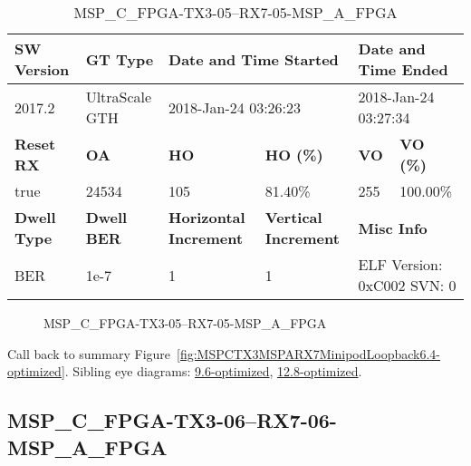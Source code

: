 \begin{table}[h]
\centering
\caption{MSP\_C\_FPGA-TX3-05--RX7-05-MSP\_A\_FPGA}
\label{tab:MSPCFPGATX305RX705MSPAFPGA6.4-optimized}
\begin{tabular}{@{}|l|l|l|l|l|l|@{}}
\toprule
\textbf{SW Version}                & \textbf{GT Type}   & \multicolumn{2}{l|}{\textbf{Date and Time Started}}            & \multicolumn{2}{l|}{\textbf{Date and Time Ended}}        \\ \midrule
2017.2                       & UltraScale GTH          & \multicolumn{2}{l|}{2018-Jan-24 03:26:23}                   & \multicolumn{2}{l|}{2018-Jan-24 03:27:34}               \\ \midrule
\textbf{Reset RX}                  & \textbf{OA} & \textbf{HO}   & \textbf{HO (\%)} & \textbf{VO} & \textbf{VO (\%)} \\ \midrule
true & 24534        & 105          & 81.40\%        & 255        & 100.00\%       \\ \midrule
\textbf{Dwell Type}                & \textbf{Dwell BER} & \textbf{Horizontal Increment} & \textbf{Vertical Increment}    & \multicolumn{2}{l|}{\textbf{Misc Info}}                  \\ \midrule
BER                            & 1e-7        & 1        & 1           & \multicolumn{2}{l|}{ELF Version: 0xC002 SVN: 0}                         \\ \bottomrule
\end{tabular}
\end{table}

\begin{figure}[h]
\caption{MSP\_C\_FPGA-TX3-05--RX7-05-MSP\_A\_FPGA} \label{fig:MSPCFPGATX305RX705MSPAFPGA6.4-optimized}
\end{figure}

Call back to summary Figure~\ref{fig:MSPCTX3MSPARX7MinipodLoopback6.4-optimized}.
Sibling eye diagrams: \hyperref[sec:MSPCFPGATX305RX705MSPAFPGA9.6-optimized]{9.6-optimized}, \hyperref[sec:MSPCFPGATX305RX705MSPAFPGA12.8-optimized]{12.8-optimized}.

\clearpage
\newpage


\subsection{MSP\_C\_FPGA-TX3-06--RX7-06-MSP\_A\_FPGA}\label{sec:MSPCFPGATX306RX706MSPAFPGA6.4-optimized}

